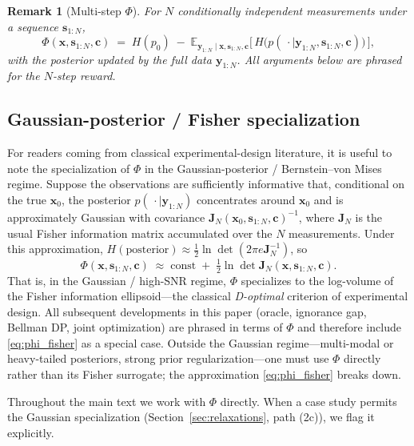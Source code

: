 \documentclass[11pt,a4paper]{article}
\newcommand{\E}{\mathbb{E}}
\newtheorem{remark}{Remark}
\begin{document}
\begin{remark}[Multi-step $\Phi$]
\label{rem:multistep}
For $N$ conditionally independent measurements under a sequence $\bm{s}_{1:N}$,
\begin{equation}
  \Phi(\bm{x}, \bm{s}_{1:N}, \bm{c}) \;=\; H(p_0) \;-\; \E_{\bm{y}_{1:N}\mid \bm{x}, \bm{s}_{1:N}, \bm{c}}\!\bigl[\, H\!\bigl(p(\,\cdot\mid\bm{y}_{1:N},\bm{s}_{1:N},\bm{c})\bigr)\,\bigr],
\end{equation}
with the posterior updated by the full data $\bm{y}_{1:N}$.  All arguments below are phrased for the $N$-step reward.
\end{remark}

\subsection{Gaussian-posterior / Fisher specialization}
\label{subsec:fisher_specialization}

For readers coming from classical experimental-design literature, it is useful to note the specialization of $\Phi$ in the Gaussian-posterior / Bernstein--von Mises regime.  Suppose the observations are sufficiently informative that, conditional on the true $\bm{x}_0$, the posterior $p(\,\cdot\mid\bm{y}_{1:N})$ concentrates around $\bm{x}_0$ and is approximately Gaussian with covariance $\bm{J}_N(\bm{x}_0, \bm{s}_{1:N}, \bm{c})^{-1}$, where $\bm{J}_N$ is the usual Fisher information matrix accumulated over the $N$ measurements.  Under this approximation, $H(\text{posterior}) \approx \tfrac{1}{2} \ln\det(2\pi e \bm{J}_N^{-1})$, so
\begin{equation}
  \Phi(\bm{x}, \bm{s}_{1:N}, \bm{c}) \;\approx\; \mathrm{const} \;+\; \tfrac{1}{2} \ln\det \bm{J}_N(\bm{x}, \bm{s}_{1:N}, \bm{c}).
  \label{eq:phi_fisher}
\end{equation}
That is, in the Gaussian / high-SNR regime, $\Phi$ specializes to the log-volume of the Fisher information ellipsoid---the classical \emph{D-optimal} criterion of experimental design.  All subsequent developments in this paper (oracle, ignorance gap, Bellman DP, joint optimization) are phrased in terms of $\Phi$ and therefore include \eqref{eq:phi_fisher} as a special case.  Outside the Gaussian regime---multi-modal or heavy-tailed posteriors, strong prior regularization---one must use $\Phi$ directly rather than its Fisher surrogate; the approximation \eqref{eq:phi_fisher} breaks down.

Throughout the main text we work with $\Phi$ directly.  When a case study permits the Gaussian specialization (Section~\ref{sec:relaxations}, path (2c)), we flag it explicitly.
\end{document}
